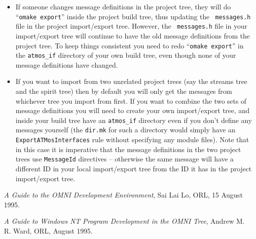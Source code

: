 \documentclass[11pt,twoside,onecolumn]{article}
\begin{document}
\begin{itemize}

\item If someone changes message definitions in the project tree, they will do
``{\tt omake export}'' inside the project build tree, thus updating the {\tt
messages.h} file in the project import/export tree.  However, the {\tt
messages.h} file in your import/export tree will continue to have the old
message definitions from the project tree.  To keep things consistent you need
to redo ``{\tt omake export}'' in the \verb|atmos_if| directory of your own
build tree, even though none of your message definitions have changed.

\item If you want to import from two unrelated project trees (say the streams
tree and the spirit tree) then by default you will only get the messages from
whichever tree you import from first.  If you want to combine the two sets of
message definitions you will need to create your own import/export tree, and
inside your build tree have an \verb|atmos_if| directory even if you don't
define any messages yourself (the {\tt dir.mk} for such a directory would
simply have an {\tt ExportATMosInterfaces} rule without specifying any module
files).  Note that in this case it is imperative that the message definitions
in the two project trees use {\tt MessageId} directives -- otherwise the same
message will have a different ID in your local import/export tree from the ID
it has in the project import/export tree.

\end{itemize}


\begin{thebibliography}{ward95}

{\em A Guide to the OMNI Development Environment},
Sai Lai Lo, ORL, 15 August 1995.

{\em A Guide to Windows NT Program Development in the OMNI Tree},
Andrew M. R. Ward, ORL, August 1995.

\end{thebibliography}
\end{document}
